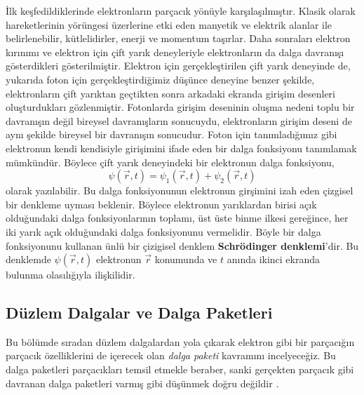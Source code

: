 \documentclass[a4paper,12pt, twoside]{article}
\begin{document}
İlk keşfedildiklerinde elektronların parçacık yönüyle karşılaşılmıştır. Klasik olarak hareketlerinin yörüngesi üzerlerine etki eden manyetik ve elektrik alanlar ile belirlenebilir, kütlelidirler, enerji ve momentum taşırlar. Daha sonraları elektron kırınımı ve elektron için çift yarık deneyleriyle elektronların da dalga davranışı gösterdikleri gösterilmiştir. Elektron için gerçekleştirilen çift yarık deneyinde de, yukarıda foton için gerçekleştirdiğimiz düşünce deneyine benzer şekilde, elektronların çift yarıktan geçtikten sonra arkadaki ekranda girişim desenleri oluşturdukları gözlenmiştir. Fotonlarda girişim deseninin oluşma nedeni toplu bir davranışın değil bireysel davranışların sonucuydu, elektronların girişim deseni de aynı şekilde bireysel bir davranışın sonucudur. Foton için tanımladığımız gibi elektronun kendi kendisiyle girişimini ifade eden bir dalga fonksiyonu tanımlamak mümkündür. Böylece çift yarık deneyindeki bir elektronun dalga fonksiyonu,
\begin{equation}
\psi(\vec r, t) = \psi_1(\vec r, t) + \psi_2(\vec r, t)
\label{eq:single_electron_wave}
\end{equation}
olarak yazılabilir. Bu dalga fonksiyonunun elektronun girşimini izah eden çizgisel bir denkleme uyması beklenir. Böylece elektronun yarıklardan birisi açık olduğundaki dalga fonksiyonlarının toplamı, üst üste binme ilkesi gereğince, her iki yarık açık olduğundaki dalga fonksiyonunu vermelidir. Böyle bir dalga fonksiyonunu kullanan ünlü bir çizigisel denklem {\bf Schrödinger denklemi}'dir. Bu denklemde $\psi (\vec r, t)$ elektronun $\vec r$ konumunda ve $t$ anında ikinci ekranda bulunma olasılığıyla ilişkilidir. 

\subsection{Düzlem Dalgalar ve Dalga Paketleri}

Bu bölümde sıradan düzlem dalgalardan yola çıkarak elektron gibi bir parçacığın parçacık özelliklerini de içerecek olan \emph{dalga paketi} kavramını incelyeceğiz. Bu dalga paketleri parçacıkları temsil etmekle beraber, sanki gerçekten parçacık gibi davranan dalga paketleri varmış gibi düşünmek doğru değildir \cite{book:Gasiorowicz}.
\end{document}
